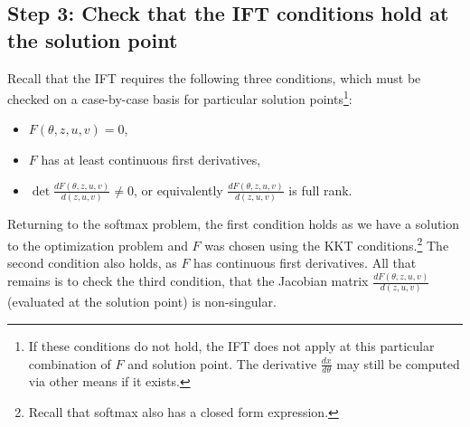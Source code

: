\documentclass[11pt]{article}
\begin{document}
\subsection*{Step 3: Check that the IFT conditions hold at the solution point}
Recall that the IFT requires the following three conditions,
which must be checked on a case-by-case basis for particular
solution points\footnote{If these conditions do not hold,
the IFT does not apply at this particular combination of $F$ and solution point.
The derivative $\frac{dx}{d\theta}$ may still be computed via other means
if it exists.}:
\begin{itemize}
    \item $F(\theta,z,u,v) = 0$,
    \item $F$ has at least continuous first derivatives,
    \item $\det\frac{dF(\theta,z,u,v)}{d(z,u,v)} \ne 0$,
        or equivalently $\frac{dF(\theta,z,u,v)}{d(z,u,v)}$
        is full rank.
\end{itemize}
Returning to the softmax problem,
the first condition holds as we have a solution to the optimization problem
and $F$ was chosen using the KKT conditions.\footnote{
Recall that softmax also has a closed form expression.}
The second condition also holds, as $F$ has continuous first derivatives.
All that remains is to check the third condition,
that the Jacobian matrix $\frac{dF(\theta,z,u,v)}{d(z,u,v)}$
(evaluated at the solution point) is non-singular.
\end{document}
